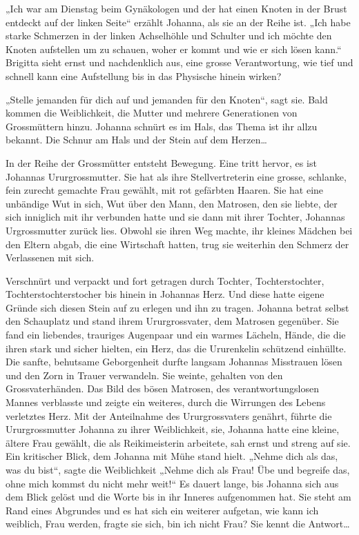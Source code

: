 \documentclass[10pt,titlepage,a5paper]{book}
\begin{document}
„Ich war am Dienstag beim Gynäkologen und der hat einen Knoten in der Brust entdeckt auf der linken Seite“ erzählt Johanna, als sie an der Reihe ist. „Ich habe starke Schmerzen in der linken Achselhöhle und Schulter und ich möchte den Knoten aufstellen um zu schauen, woher er kommt und wie er sich lösen kann.“ Brigitta sieht ernst und nachdenklich aus, eine grosse Verantwortung, wie tief und schnell kann eine Aufstellung bis in das Physische hinein wirken?

„Stelle jemanden für dich auf und jemanden für den Knoten“, sagt sie.
Bald kommen die Weiblichkeit, die Mutter und mehrere Generationen von Grossmüttern hinzu. Johanna schnürt es im Hals, das Thema ist ihr allzu bekannt. Die Schnur am Hals und der Stein auf dem Herzen\dots 

In der Reihe der Grossmütter entsteht Bewegung. Eine tritt hervor, es ist Johannas Ururgrossmutter. Sie hat als ihre Stellvertreterin eine grosse, schlanke, fein zurecht gemachte Frau gewählt, mit rot gefärbten Haaren. Sie hat eine unbändige Wut in sich, Wut über den Mann, den Matrosen, den sie liebte, der sich inniglich mit ihr verbunden hatte und sie dann mit ihrer Tochter, Johannas Urgrossmutter zurück lies. Obwohl sie ihren Weg machte, ihr kleines Mädchen bei den Eltern abgab, die eine Wirtschaft hatten, trug sie weiterhin den Schmerz der Verlassenen mit sich.

Verschnürt und verpackt und fort getragen durch Tochter, Tochterstochter, Tochterstochterstocher bis hinein in Johannas  Herz. Und diese hatte eigene Gründe sich diesen Stein auf zu erlegen und ihn zu tragen. Johanna betrat selbst den Schauplatz und stand ihrem Ururgrossvater, dem Matrosen gegenüber. Sie fand ein liebendes, trauriges Augenpaar und ein warmes Lächeln, Hände, die die ihren stark und sicher hielten, ein Herz, das die Ururenkelin schützend einhüllte. Die sanfte, behutsame Geborgenheit durfte langsam Johannas Misstrauen lösen und den Zorn in Trauer verwandeln. Sie weinte, gehalten von den Grossvaterhänden. Das Bild des bösen Matrosen, des verantwortungslosen Mannes verblasste und zeigte ein weiteres, durch die Wirrungen des Lebens verletztes Herz. Mit der Anteilnahme des Ururgrossvaters genährt, führte die Ururgrossmutter Johanna zu ihrer Weiblichkeit, sie, Johanna hatte eine kleine, ältere Frau gewählt, die als Reikimeisterin arbeitete, sah ernst und streng auf sie. Ein kritischer Blick, dem Johanna mit Mühe stand hielt. „Nehme dich als das, was du bist“, sagte die Weiblichkeit „Nehme dich als Frau! Übe und begreife das, ohne mich kommst du nicht mehr weit!“ Es dauert lange, bis Johanna sich aus dem Blick gelöst und die Worte bis in ihr Inneres aufgenommen hat. Sie steht am Rand eines Abgrundes und es hat sich ein weiterer aufgetan, wie kann ich weiblich, Frau werden, fragte sie sich, bin ich nicht Frau? Sie kennt die Antwort\dots 
\end{document}
